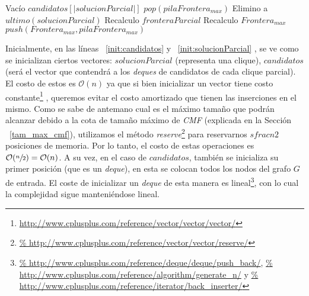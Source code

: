 \begin{pseudocodigo}
                \EndIf {}%
                \State Vac\'io $candidatos[|solucionParcial|]$ 
                 
                    \State $pop(pilaFrontera_{max})$ 
                    \State Elimino a $ultimo(solucionParcial)$ 
                    \State Recalculo $fronteraParcial$ 
                    \State Recalculo $Frontera_{max}$ 
                    \State $push(Frontera_{max},pilaFrontera_{max})$ 
                \EndIf {}
            \EndIf {}
        \EndWhile {}
    \EndIf {}%

    \State {} %
    \Statex
    \Statex {}
\end{pseudocodigo}

\bigskip

\par Inicialmente, en las l\'ineas ~\ref{init:candidatos} y ~\ref{init:solucionParcial} ,
    se ve como se inicializan ciertos vectores: $solucionParcial$ (representa una clique),
    $candidatos$ (ser\'a el vector que contendr\'a a los \emph{deques} de candidatos
    de cada clique parcial). El costo de estos es $\mathcal O(n)$ ya que si bien
    inicializar un vector tiene costo constante\footnote{\url{http://www.cplusplus.com/reference/vector/vector/vector/}}
    , queremos evitar el costo amortizado que tienen las inserciones en el mismo. Como
    se sabe de antemano cual es el m\'aximo tama\~no que podr\'an alcanzar debido a la
    cota de tama\~no m\'aximo de \emph{CMF} (explicada en la Secci\'on ~\ref{tam_max_cmf}),
    utilizamos el m\'etodo \emph{reserve}\footnote{\url{%
    http://www.cplusplus.com/reference/vector/vector/reserve/}} para reservarnos
    $sfrac{n}{2}$ posiciones de memoria. Por lo tanto, el costo de estas operaciones
    es $\mathcal O(\sfrac{n}{2}) = \mathcal O(n)$. A su vez, en el caso de $candidatos$,
    tambi\'en se inicializa su primer posici\'on (que es un \emph{deque}), en esta
    se colocan todos los nodos del grafo $G$ de entrada. El coste de inicializar
    un \emph{deque} de esta manera es lineal\footnote{\url{%
    http://www.cplusplus.com/reference/deque/deque/push_back/}, \url{%
    http://www.cplusplus.com/reference/algorithm/generate_n/} y \url{%
    http://www.cplusplus.com/reference/iterator/back_inserter/}}, con lo cual la complejidad
    sigue manteni\'endose lineal.

